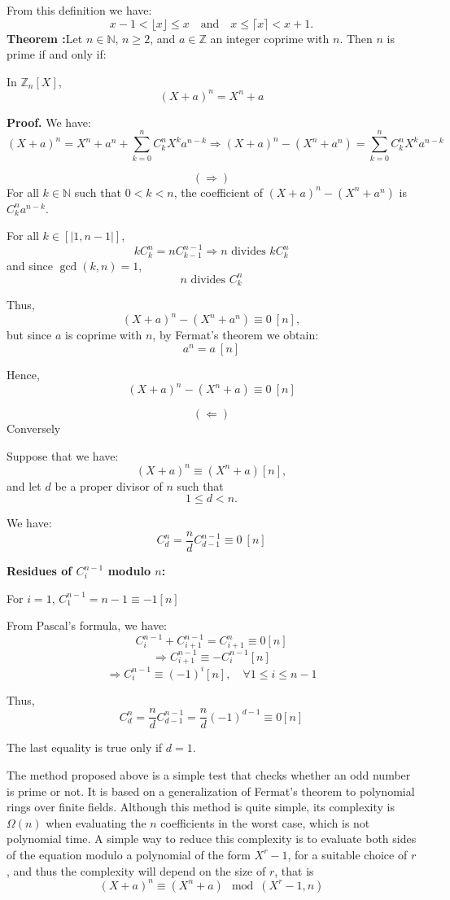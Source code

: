 From this definition we have:
\[
x - 1 < \lfloor x \rfloor \le x \quad \text{and} \quad x \le \lceil x \rceil < x + 1.
\]
\textbf{Theorem :}Let $n \in \mathbb{N}$, $n \ge 2$, and $a \in \mathbb{Z}$ an integer coprime with $n$.  
Then $n$ is prime if and only if:

In $\mathbb{Z}_n[X]$,
\[
(X + a)^n = X^n + a 
\]

\textbf{Proof.} We have:
\[
(X + a)^n = X^n + a^n + \sum_{k=0}^{n} C_k^n X^k a^{n-k}
\Rightarrow (X + a)^n - (X^n + a^n)
= \sum_{k=0}^{n} C_k^n X^k a^{n-k}
\]

\[(\Rightarrow)\] For all $k \in \mathbb{N}$ such that $0 < k < n$, the coefficient of  
$(X + a)^n - (X^n + a^n)$ is $C_k^n a^{n-k}$.



For all $k \in [|1, n-1|]$,
\[
k C_k^n = n C_{k-1}^{n-1}
\Rightarrow n \text{ divides } k C_k^n
\]
and since $\gcd(k, n) = 1$,
\[
n \text{ divides } C_k^n
\]

Thus,
\[
(X + a)^n - (X^n + a^n) \equiv 0 \ [n],
\]
but since $a$ is coprime with $n$, by Fermat's theorem we obtain:
\[
a^n = a \ [n]
\]

Hence,
\[
(X + a)^n - (X^n + a) \equiv 0 \ [n]
\]

\[(\Leftarrow)\] Conversely

Suppose that we have:
\[
(X + a)^n \equiv (X^n + a)[n],
\]
and let $d$ be a proper divisor of $n$ such that
\[
1 \le d < n.
\]

We have:
\[
C_d^n = \frac{n}{d} C_{d-1}^{n-1} \equiv 0 \ [n]
\]

\textbf{Residues of $C_i^{n-1}$ modulo $n$:}

For $i = 1$, $C_1^{n-1} = n - 1 \equiv -1 [n]$

From Pascal's formula, we have:
\[
C_i^{n-1} + C_{i+1}^{n-1} = C_{i+1}^{n} \equiv 0 [n]
\]
\[
\Rightarrow C_{i+1}^{n-1} \equiv -C_i^{n-1} [n]
\]
\[
\Rightarrow C_i^{n-1} \equiv (-1)^i [n], \quad \forall 1 \le i \le n-1
\]

Thus,
\[
C_d^n = \frac{n}{d} C_{d-1}^{n-1} = \frac{n}{d} (-1)^{d-1} \equiv 0 [n]
\]

The last equality is true only if $d = 1$.

The method proposed above is a simple test that checks whether an odd number is prime or not. It is based on a generalization of Fermat's theorem to polynomial rings over finite fields. Although this method is quite simple, its complexity is $\Omega(n)$ when evaluating the $n$ coefficients in the worst case, which is not polynomial time. A simple way to reduce this complexity is to evaluate both sides of the equation modulo a polynomial of the form $X^r - 1$, for a suitable choice of $r$, and thus the complexity will depend on the size of $r$, that is
\[
(X + a)^n \equiv (X^n + a) \mod (X^r - 1, n) \tag{*}
\]

